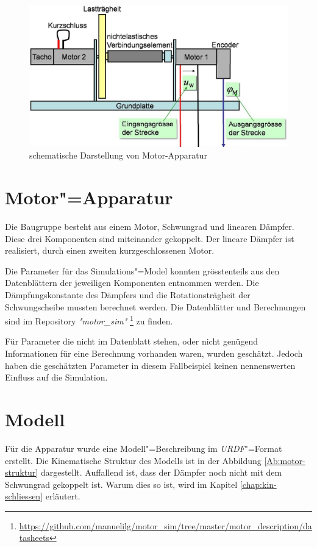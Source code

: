 \begin{figure}[ht!]
	\centering
	\includegraphics[width=14.5cm]{images/motor_baugruppe.png}
	\caption{schematische Darstellung von Motor-Apparatur}
	\label{Ab:motor-baugruppe}
\end{figure}

\section{Motor"=Apparatur}
Die Baugruppe besteht aus einem Motor, Schwungrad und linearen Dämpfer.
Diese drei Komponenten sind miteinander gekoppelt.
Der lineare Dämpfer ist realisiert, durch einen zweiten kurzgeschlossenen Motor.

Die Parameter für das Simulations"=Model konnten grösstenteils aus den Datenblättern der jeweiligen Komponenten entnommen werden. 
Die Dämpfungskonstante des Dämpfers und die Rotationsträgheit der Schwungscheibe mussten berechnet werden.
Die Datenblätter und Berechnungen sind im Repository \textit{\textsc{"}motor\_sim\textit{"}} \footnote{\url{https://github.com/manuelilg/motor\_sim/tree/master/motor\_description/datasheets}} zu finden. 

Für Parameter die nicht im Datenblatt stehen, oder nicht genügend Informationen für eine Berechnung vorhanden waren, wurden geschätzt.
Jedoch haben die geschätzten Parameter in diesem Fallbeispiel keinen nennenswerten Einfluss auf die Simulation.


\section{Modell}
Für die Apparatur wurde eine Modell"=Beschreibung im \textit{URDF}"=Format erstellt.
Die Kinematische Struktur des Modells ist in der Abbildung \ref{Ab:motor-struktur} dargestellt.
Auffallend ist, dass der Dämpfer noch nicht mit dem Schwungrad gekoppelt ist.
Warum dies so ist, wird im Kapitel \ref{chap:kin-schliessen} erläutert.

